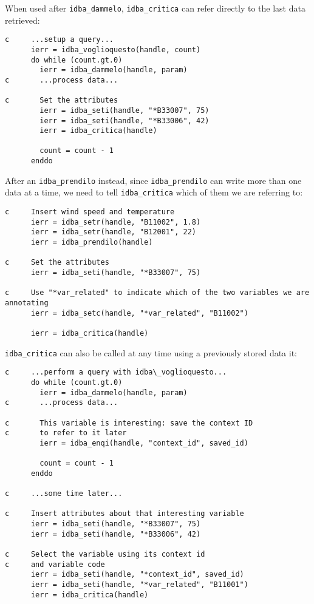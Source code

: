 \documentclass[final,12pt,a4paper,twoside]{book}
\begin{document}
When used after {\tt idba\_dammelo}, {\tt idba\_critica} can refer directly to the
last data retrieved:

\begin{verbatim}
c     ...setup a query...
      ierr = idba_voglioquesto(handle, count)
      do while (count.gt.0)
        ierr = idba_dammelo(handle, param)
c       ...process data...

c       Set the attributes
        ierr = idba_seti(handle, "*B33007", 75)
        ierr = idba_seti(handle, "*B33006", 42)
        ierr = idba_critica(handle)

        count = count - 1
      enddo
\end{verbatim}

After an {\tt idba\_prendilo} instead, since {\tt idba\_prendilo} can write more than
one data at a time, we need to tell {\tt idba\_critica} which of them we are
referring to:

\begin{verbatim}
c     Insert wind speed and temperature
      ierr = idba_setr(handle, "B11002", 1.8)
      ierr = idba_setr(handle, "B12001", 22)
      ierr = idba_prendilo(handle)

c     Set the attributes
      ierr = idba_seti(handle, "*B33007", 75)

c     Use "*var_related" to indicate which of the two variables we are annotating
      ierr = idba_setc(handle, "*var_related", "B11002")

      ierr = idba_critica(handle)
\end{verbatim}


{\tt idba\_critica} can also be called at any time using a previously stored data it:

\begin{verbatim}
c     ...perform a query with idba\_voglioquesto...
      do while (count.gt.0)
        ierr = idba_dammelo(handle, param)
c       ...process data...

c       This variable is interesting: save the context ID
c       to refer to it later
        ierr = idba_enqi(handle, "context_id", saved_id)
        
        count = count - 1
      enddo

c     ...some time later...

c     Insert attributes about that interesting variable
      ierr = idba_seti(handle, "*B33007", 75)
      ierr = idba_seti(handle, "*B33006", 42)
      
c     Select the variable using its context id
c     and variable code
      ierr = idba_seti(handle, "*context_id", saved_id)
      ierr = idba_seti(handle, "*var_related", "B11001")
      ierr = idba_critica(handle)
\end{verbatim}
\end{document}
